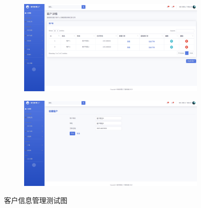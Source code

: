 \begin{figure}[H]
    \centering
    \begin{subfigure}{.45\textwidth}
        \centering
        \includegraphics[width=\textwidth]{figures/6viewallcustomer.png}
    \end{subfigure}
    \qquad
    \begin{subfigure}{.45\textwidth}
        \centering
        \includegraphics[width=\textwidth]{figures/6addnewcustomer.png}
    \end{subfigure}
    \caption{客户信息管理测试图}
    \label{fig:cstmtst}
\end{figure}

